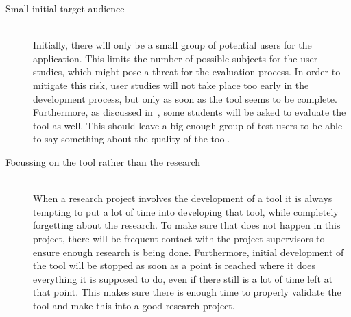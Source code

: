 \begin{description}
\item[Small initial target audience]~~\\
Initially, there will only be a small group of potential users for the application. This limits the number of possible subjects for the user studies, which might pose a threat for the evaluation process. In order to mitigate this risk, user studies will not take place too early in the development process, but only as soon as the tool seems to be complete. Furthermore, as discussed in~, some students will be asked to evaluate the tool as well. This should leave a big enough group of test users to be able to say something about the quality of the tool.

\item[Focussing on the tool rather than the research]~~\\
When a research project involves the development of a tool it is always tempting to put a lot of time into developing that tool, while completely forgetting about the research. To make sure that does not happen in this project, there will be frequent contact with the project supervisors to ensure enough research is being done. Furthermore, initial development of the tool will be stopped as soon as a point is reached where it does everything it is supposed to do, even if there still is a lot of time left at that point. This makes sure there is enough time to properly validate the tool and make this into a good research project.
\end{description}
